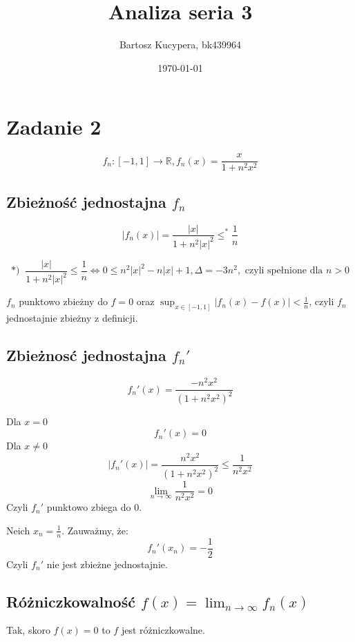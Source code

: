 \documentclass{article}
\title{Analiza seria 3}
\author{Bartosz Kucypera, bk439964}
\date{\today}
\begin{document}
\maketitle

\section*{Zadanie 2}
$$f_n:[-1, 1] \to \mathbb{R}, f_n(x) = \frac{x}{1+n^2x^2}$$

\subsection*{Zbieżność jednostajna $f_n$}
$$ |f_n(x)| = \frac{|x|}{1+n^2|x|^2} \le^* \frac{1}{n}$$

$$*) \; \; \frac{|x|}{1+n^2|x|^2} \le \frac{1}{n} \Leftrightarrow 0 \le n^2|x|^2 - n|x| + 1, 
\Delta = -3n^2, \mbox{ czyli spełnione dla } n > 0 $$

$f_n$ punktowo zbieżny do $f = 0$ oraz $\sup_{x\in[-1,1]}|f_n(x) - f(x)| < \frac{1}{n}$, czyli $f_n$ jednostajnie zbieżny z definicji.

\subsection*{Zbieżnosć jednostajna $f_n'$}

$$f_n'(x) = \frac{-n^2x^2}{(1+n^2x^2)^2} $$

Dla $x = 0$
$$f_n'(x) = 0$$
Dla $x \ne 0$
$$|f_n'(x)| = \frac{n^2x^2}{(1+n^2x^2)^2} \le \frac{1}{n^2x^2}$$
$$\displaystyle \lim_{n \to \infty } \frac{1}{n^2x^2} = 0 $$
Czyli $f_n'$ punktowo zbiega do 0. \newline \newline

Neich $x_n = \frac{1}{n}$. Zauważmy, że:
$$ f_n'(x_n) = -\frac{1}{2} $$
Czyli $f_n'$ nie jest zbieżne jednostajnie.

\subsection*{Różniczkowalność $f(x) = \displaystyle \lim_{n \to \infty} f_n(x)$}
Tak, skoro $f(x) = 0$ to $f$ jest różniczkowalne.
\end{document}

